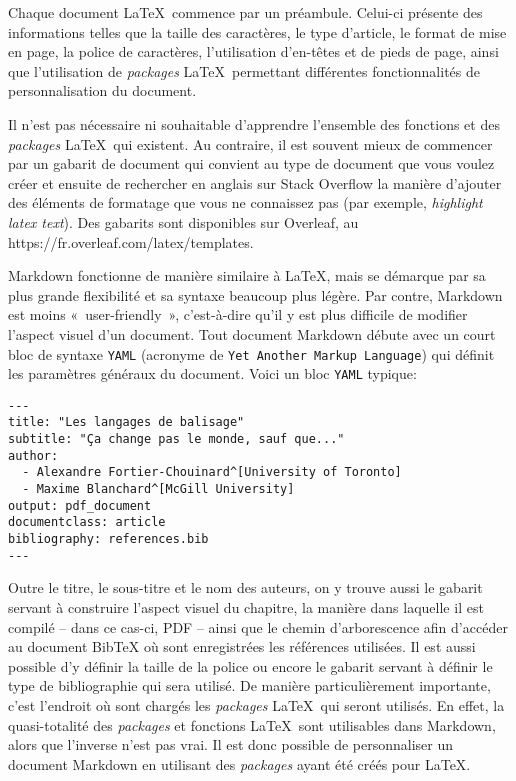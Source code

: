 \documentclass[
  letterpaper,
  DIV=11,
  numbers=noendperiod]{scrreprt}
\begin{document}
Chaque document \LaTeX~commence par un préambule. Celui-ci présente des
informations telles que la taille des caractères, le type d'article, le
format de mise en page, la police de caractères, l'utilisation
d'en-têtes et de pieds de page, ainsi que l'utilisation de
\emph{packages} \LaTeX~permettant différentes fonctionnalités de
personnalisation du document.

Il n'est pas nécessaire ni souhaitable d'apprendre l'ensemble des
fonctions et des \emph{packages} \LaTeX~qui existent. Au contraire, il
est souvent mieux de commencer par un gabarit de document qui convient
au type de document que vous voulez créer et ensuite de rechercher en
anglais sur Stack Overflow la manière d'ajouter des éléments de
formatage que vous ne connaissez pas (par exemple, \emph{highlight latex
text}). Des gabarits sont disponibles sur Overleaf, au
https://fr.overleaf.com/latex/templates.

Markdown fonctionne de manière similaire à \LaTeX, mais se démarque par
sa plus grande flexibilité et sa syntaxe beaucoup plus légère. Par
contre, Markdown est moins «~user-friendly~», c'est-à-dire qu'il y est
plus difficile de modifier l'aspect visuel d'un document. Tout document
Markdown débute avec un court bloc de syntaxe \texttt{YAML} (acronyme de
\texttt{Yet\ Another\ Markup\ Language}) qui définit les paramètres
généraux du document. Voici un bloc \texttt{YAML} typique:

\begin{verbatim}
---
title: "Les langages de balisage"
subtitle: "Ça change pas le monde, sauf que..."
author:
  - Alexandre Fortier-Chouinard^[University of Toronto]
  - Maxime Blanchard^[McGill University]
output: pdf_document
documentclass: article
bibliography: references.bib
---
\end{verbatim}

Outre le titre, le sous-titre et le nom des auteurs, on y trouve aussi
le gabarit servant à construire l'aspect visuel du chapitre, la manière
dans laquelle il est compilé -- dans ce cas-ci, PDF -- ainsi que le
chemin d'arborescence afin d'accéder au document BibTeX où sont
enregistrées les références utilisées. Il est aussi possible d'y définir
la taille de la police ou encore le gabarit servant à définir le type de
bibliographie qui sera utilisé. De manière particulièrement importante,
c'est l'endroit où sont chargés les \emph{packages} \LaTeX~qui seront
utilisés. En effet, la quasi-totalité des \emph{packages} et fonctions
\LaTeX~sont utilisables dans Markdown, alors que l'inverse n'est pas
vrai. Il est donc possible de personnaliser un document Markdown en
utilisant des \emph{packages} ayant été créés pour \LaTeX.
\end{document}
